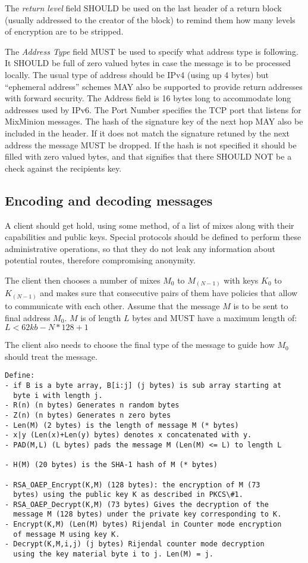 \documentclass{article}
\begin{document}
The \emph{return level} field SHOULD be used on the last header of a
return block (usually addressed to the creator of the block) to remind
them how many levels of encryption are to be stripped.

The \emph{Address Type} field MUST be used to specify what address type is
following. It SHOULD be full of zero valued bytes in case the message
is to be processed locally. The usual type of address should be IPv4
(using up 4 bytes) but ``ephemeral address'' schemes MAY also be
supported to provide return addresses with forward security. The
Address field is 16 bytes long to accommodate long addresses used by
IPv6. The Port Number specifies the TCP port that listens for
MixMinion messages. The hash of the signature key of the next hop MAY
also be included in the header. If it does not match the signature
retuned by the next address the message MUST be dropped. If the hash
is not specified it should be filled with zero valued bytes, and that
signifies that there SHOULD NOT be a check against the recipients key.

\subsection{Encoding and decoding messages}

A client should get hold, using some method, of a list of mixes along with 
their capabilities and public keys. Special protocols should be defined to 
perform these administrative operations, so that they do not leak any 
information about potential routes, therefore compromising anonymity.

The client then chooses a number of mixes $M_0$ to $M_(N-1)$ with keys
$K_0$ to $K_(N-1)$ and makes sure that consecutive pairs of them have
policies that allow to communicate with each other. Assume that the
message $M$ is to be sent to final address $M_0$. $M$ is of length $L$
bytes and MUST have a maximum length of:
\( L < 62kb - N*128 + 1 \)

The client also needs to choose the final type of the message to guide
how $M_0$ should treat the message.

\begin{verbatim}
Define:
- if B is a byte array, B[i:j] (j bytes) is sub array starting at 
  byte i with length j.
- R(n) (n bytes) Generates n random bytes 
- Z(n) (n bytes) Generates n zero bytes
- Len(M) (2 bytes) is the length of message M (* bytes)
- x|y (Len(x)+Len(y) bytes) denotes x concatenated with y.
- PAD(M,L) (L bytes) pads the message M (Len(M) <= L) to length L

- H(M) (20 bytes) is the SHA-1 hash of M (* bytes)

- RSA_OAEP_Encrypt(K,M) (128 bytes): the encryption of M (73
  bytes) using the public key K as described in PKCS\#1.
- RSA_OAEP_Decrypt(K,M) (73 bytes) Gives the decryption of the
  message M (128 bytes) under the private key corresponding to K.
- Encrypt(K,M) (Len(M) bytes) Rijendal in Counter mode encryption 
  of message M using key K. 
- Decrypt(K,M,i,j) (j bytes) Rijendal counter mode decryption 
  using the key material byte i to j. Len(M) = j.
\end{verbatim}
\end{document}

